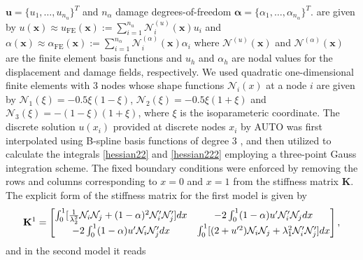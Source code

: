 $
\mathbf{u} = \{ u_1, \ldots, u_{n_u} \}^T 
$
and \( n_\alpha \) damage degrees-of-freedom 
$
\boldsymbol{\alpha} = \{ \alpha_1, \ldots, \alpha_{n_\alpha} \}^T.
$ are given by 
$
u(\mathbf{x}) \approx u_{\text{FE}} (\mathbf{x}) := \sum_{i=1}^{n_u} \mathcal{N}^{(u)}_i(\mathbf{x}) u_i $
and $\alpha(\mathbf{x}) \approx \alpha_{\text{FE}} (\mathbf{x}) := \sum_{i=1}^{n_\alpha} \mathcal{N}^{(\alpha)}_i (\mathbf{x}) \alpha_i 
$
where $\mathcal{N}^{(u)}(\mathbf{x}) $ and $\mathcal{N}^{(\alpha)}(\mathbf{x}) $ are the finite element basis functions and  $u_h$ and  $\alpha_h$ are nodal values for the displacement and damage fields, respectively. We used quadratic one-dimensional finite elements with 3 nodes  whose   shape functions   ${\mathcal N}_i(x)$ at a node $i$  are given by ${\mathcal N}_1(\xi)=-0.5\xi(1-\xi)$, ${\mathcal N}_2(\xi)=-0.5\xi(1+\xi)$ and ${\mathcal N}_3(\xi)=-(1-\xi)(1+\xi)$, where $\xi$ is the isoparameteric coordinate. The discrete solution $u(x_i)$ provided at discrete nodes $x_i$ by AUTO was first interpolated using B-spline basis functions of degree 3 \cite{Grimstad2016-cq}, and then utilized to calculate the integrals \eqref{hessian22} and   \ref{hessian222} employing a three-point Gauss integration scheme. The fixed boundary conditions were enforced by removing the rows and columns corresponding to $x = 0$ and $x = 1$ from the stiffness  matrix $\mathbf{K}$. The explicit form of the stiffness matrix for the first model is given by  
\begin{equation}
{\bf K}^1=\begin{bmatrix}
\int_0^1[ \frac{1}{\lambda_2^2}{\mathcal N}_i{\mathcal N}_j + (1-\alpha)^2{\mathcal N}'_i{\mathcal N}'_j
] dx&
-2\int_0^1(1-\alpha)u' {\mathcal N}'_i {\mathcal N}_j  dx\\
-2\int_0^1(1-\alpha)u' {\mathcal N}_i {\mathcal N}'_j dx
& \int_0^1 [ (2+u'^2){\mathcal N}_i{\mathcal N}_j +\lambda_1^2{\mathcal N}'_i{\mathcal N}'_j] dx
\end{bmatrix},
\label{eq:stifness1}
\end{equation}
and in the second model it reads

